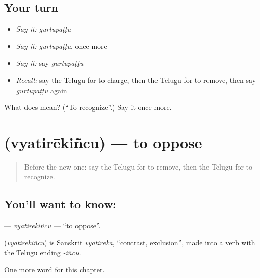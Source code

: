 \subsection*{Your turn}
\begin{itemize}
\raggedright
  \item \emph{Say it:} \emph{gurtupaṭṭu}
  \item \emph{Say it:} \emph{gurtupaṭṭu}, once more
  \item \emph{Say it:} say \emph{gurtupaṭṭu}
  \item \emph{Recall:} say the Telugu for to charge, then the Telugu for to remove, then say \emph{gurtupaṭṭu} again
\end{itemize}

\begin{tcolorbox}[breakable,colback=teal!4,colframe=teal!35!black,title={Before you move on}]
What does  mean? (\textquotedblleft{}To recognize\textquotedblright{}.) Say it once more.
\end{tcolorbox}
\section[\texorpdfstring{\te{వ్యతిరేకించు} (vyatirēkiñcu)}{వ్యతిరేకించు (vyatirēkiñcu)}]{ (vyatirēkiñcu) — to oppose}

\label{lesson:TE-C283-vyatirekincu}



\begin{quote}
Before the new one: say the Telugu for to remove, then the Telugu for to recognize.
\end{quote}

\subsection*{You'll want to know: }
\textbf{} — \emph{vyatirēkiñcu} — \textquotedblleft{}to oppose\textquotedblright{}.

\begin{cousinweb}
\textbf{} (\emph{vyatirēkiñcu}) is Sanskrit \emph{vyatirēka}, \textquotedblleft{}contrast, exclusion\textquotedblright{}, made into a verb with the Telugu ending \emph{-iñcu}.
\end{cousinweb}

\begin{grammarlens}[title={What you've built}]
One more word for this chapter.
\end{grammarlens}

